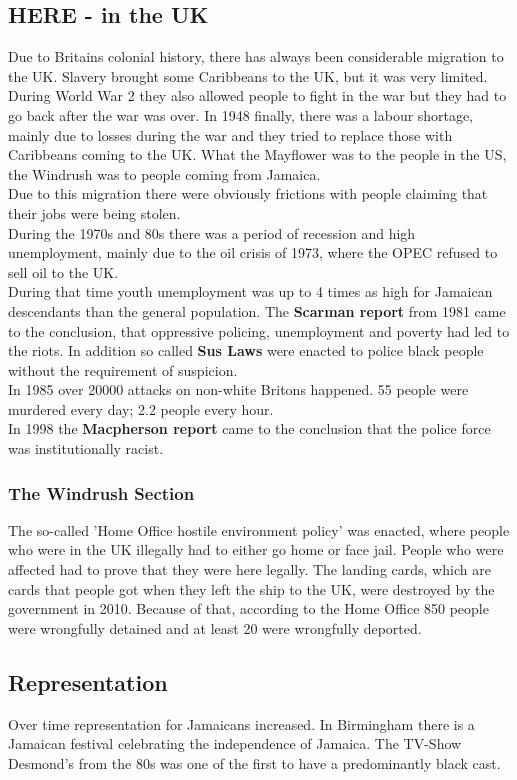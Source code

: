 \documentclass{article}
\begin{document}
	\subsection{HERE - in the UK}
	Due to Britains colonial history, there has always been considerable migration to the UK. Slavery brought some Caribbeans to the UK, but it was very limited. During World War 2 they also allowed people to fight in the war but they had to go back after the war was over. In 1948 finally, there was a labour shortage, mainly due to losses during the war and they tried to replace those with Caribbeans coming to the UK. What the Mayflower was to the people in the US, the Windrush was to people coming from Jamaica. \\
	Due to this migration there were obviously frictions with people claiming that their jobs were being stolen. \\
	During the 1970s and 80s there was a period of recession and high unemployment, mainly due to the oil crisis of 1973, where the OPEC refused to sell oil to the UK. \\
	During that time youth unemployment was up to 4 times as high for Jamaican descendants than the general population. The \textbf{Scarman report} from 1981 came to the conclusion, that oppressive policing, unemployment and poverty had led to the riots. In addition so called \textbf{Sus Laws} were enacted to police black people without the requirement of suspicion. \\
	In 1985 over 20000 attacks on non-white Britons happened. 55 people were murdered every day; 2.2 people every hour. \\
	In 1998 the \textbf{Macpherson report} came to the conclusion that the police force was institutionally racist. \\
	\subsubsection{The Windrush Section}
	The so-called 'Home Office hostile environment policy' was enacted, where people who were in the UK illegally had to either go home or face jail. People who were affected had to prove that they were here legally. The landing cards, which are cards that people got when they left the ship to the UK, were destroyed by the government in 2010. Because of that, according to the Home Office 850 people were wrongfully detained and at least 20 were wrongfully deported. \\
	\subsection{Representation}
	Over time representation for Jamaicans increased. In Birmingham there is a Jamaican festival celebrating the independence of Jamaica. The TV-Show Desmond's from the 80s was one of the first to have a predominantly black cast. \\
\end{document}

